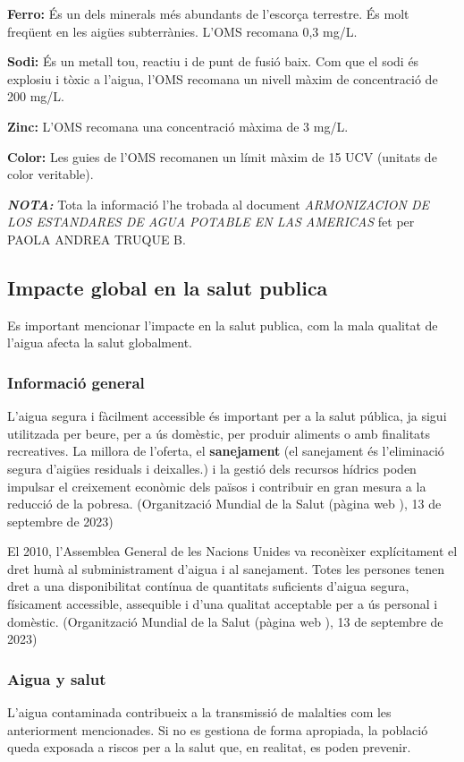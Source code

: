 \textbf{Ferro:} És un dels minerals més abundants de l’escorça terrestre. És molt freqüent en les aigües subterrànies. L’OMS recomana 0,3 mg/L.

\textbf{Sodi:} És un metall tou, reactiu i de punt de fusió baix. Com que el sodi és explosiu i tòxic a l’aigua, l’OMS recomana un nivell màxim de concentració de 200 mg/L.

\textbf{Zinc:} L’OMS recomana una concentració màxima de 3 mg/L.

\textbf{Color:} Les guies de l’OMS recomanen un límit màxim de 15 UCV (unitats de color veritable).

\textit{\textbf{NOTA:}} Tota la informació l'he trobada al document \textit{ARMONIZACION DE LOS ESTANDARES DE AGUA POTABLE EN LAS
AMERICAS} \cite{OMSN} fet per PAOLA ANDREA TRUQUE B.\\

\subsection{Impacte global en la salut publica}
Es important mencionar l'impacte en la salut publica, com la mala qualitat de l'aigua afecta la salut globalment.
\subsubsection{Informació general}
L'aigua segura i fàcilment accessible és important per a la salut pública, ja sigui utilitzada per beure, per a ús domèstic, per produir aliments o amb finalitats recreatives. La millora de l'oferta, el \textbf{sanejament} (el sanejament és l’eliminació segura d’aigües residuals i deixalles.) i la gestió dels recursos hídrics poden impulsar el creixement econòmic dels països i contribuir en gran mesura a la reducció de la pobresa. (Organització Mundial de la Salut (pàgina web \cite{OrgaNS}), 13 de septembre de 2023)

El 2010, l'Assemblea General de les Nacions Unides va reconèixer explícitament el dret humà al subministrament d'aigua i al sanejament. Totes les persones tenen dret a una disponibilitat contínua de quantitats suficients d'aigua segura, físicament accessible, assequible i d'una qualitat acceptable per a ús personal i domèstic. (Organització Mundial de la Salut (pàgina web \cite{OrgaNS}), 13 de septembre de 2023)
\subsubsection{Aigua y salut}
L’aigua contaminada contribueix a la transmissió de malalties com les anteriorment mencionades. Si no es gestiona de forma apropiada, la població queda exposada a riscos per a la salut que, en realitat, es poden prevenir.

